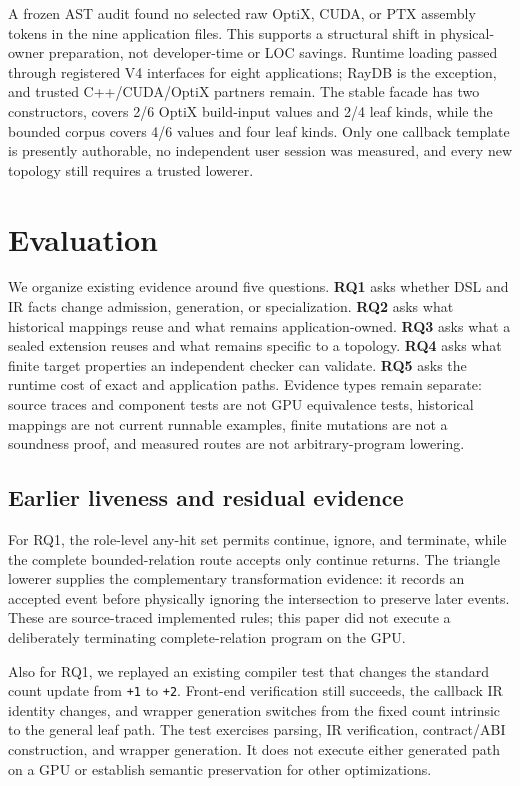 \documentclass[sigplan,screen,review,anonymous]{acmart}
\begin{document}
A frozen AST audit found no selected raw OptiX, CUDA, or PTX assembly tokens in
the nine application files. This supports a structural shift in physical-owner
preparation, not developer-time or LOC savings. Runtime loading passed through
registered V4 interfaces for eight applications; RayDB is the exception, and
trusted C++/CUDA/OptiX partners remain. The stable facade has two constructors,
covers 2/6 OptiX build-input values and 2/4 leaf kinds, while the bounded corpus
covers 4/6 values and four leaf kinds. Only one callback template is presently
authorable, no independent user session was measured, and every new topology
still requires a trusted lowerer.

\section{Evaluation}

We organize existing evidence around five questions. \textbf{RQ1} asks whether
DSL and IR facts change admission, generation, or specialization. \textbf{RQ2}
asks what historical mappings reuse and what remains application-owned.
\textbf{RQ3} asks what a sealed extension reuses and what remains specific to a
topology. \textbf{RQ4} asks what finite target properties an independent checker
can validate. \textbf{RQ5} asks the runtime cost of exact and application paths. Evidence
types remain separate: source traces and component tests are not GPU
equivalence tests, historical mappings are not current runnable examples,
finite mutations are not a soundness proof, and measured routes are not
arbitrary-program lowering.

\subsection{Earlier liveness and residual evidence}

For RQ1, the role-level any-hit set permits continue, ignore, and terminate,
while the complete bounded-relation route accepts only continue returns. The
triangle lowerer supplies the complementary transformation evidence: it records
an accepted event before physically ignoring the intersection to preserve later
events. These are source-traced implemented rules; this paper did not execute a
deliberately terminating complete-relation program on the GPU.

Also for RQ1, we replayed an existing compiler test that changes the standard count
update from \texttt{+1} to \texttt{+2}. Front-end verification still succeeds,
the callback IR identity changes, and wrapper generation switches from the
fixed count intrinsic to the general leaf path. The test exercises parsing, IR
verification, contract/ABI construction, and wrapper generation. It does not
execute either generated path on a GPU or establish semantic preservation for
other optimizations.
\end{document}
